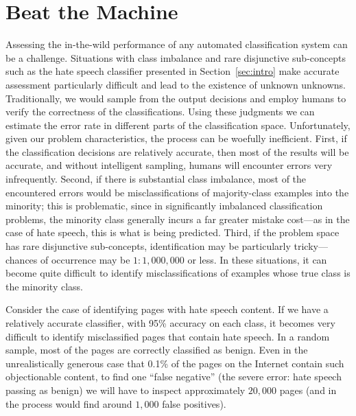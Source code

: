 \section{Beat the Machine}
\label{sec:btm}


Assessing the in-the-wild performance of any automated classification system can be a challenge. Situations with class imbalance and rare disjunctive sub-concepts such as the hate speech classifier presented in Section~\ref{sec:intro} make accurate assessment particularly difficult and lead to the existence of unknown unknowns. Traditionally, we would sample from the output decisions and employ humans to verify the correctness of the classifications.  Using these judgments we can estimate the error rate in different parts of the classification space. Unfortunately, given our problem characteristics, the process can be woefully inefficient. First, if the classification decisions are relatively accurate, then most of the results will be accurate, and without intelligent sampling, humans will encounter errors very infrequently. Second, if there is substantial class imbalance, most of the encountered errors would be misclassifications of majority-class examples  into the minority; this is problematic, since in significantly imbalanced classification problems, the minority class generally incurs a far greater mistake cost---as in the case of hate speech, this is what is being predicted. Third, if the problem space has rare disjunctive sub-concepts, identification may be particularly tricky---chances of occurrence may be $1:1,000,000$ or less. In these situations, it can become quite difficult to identify misclassifications of examples whose true class is the minority class. 

\begin{xmpl} Consider the case of identifying pages with hate speech content. If we have a relatively accurate classifier, with 95\% accuracy on each class, it becomes very difficult to identify misclassified pages that contain hate speech. In a random sample, most of the pages are correctly classified as benign. Even in the unrealistically generous case that 
0.1\% of the pages on the Internet contain such objectionable content, to find one ``false negative'' (the severe error: hate speech passing as benign) we will have to inspect approximately $20,000$ pages (and in the process would find around $1,000$ false positives). \smartqed

\end{xmpl} 

